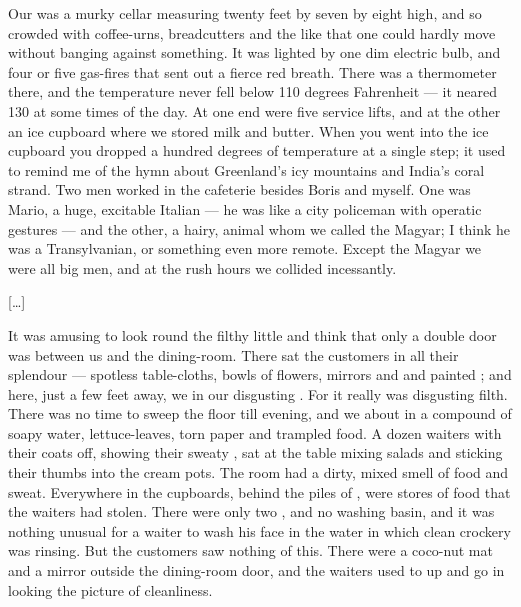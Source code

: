 \documentclass{fiche}
\begin{document}
\begin{texte}
Our  was a murky cellar
measuring twenty feet by seven by eight high, and so crowded with coffee-urns, breadcutters
and the like that one could hardly move without banging against something. It was lighted by
one dim electric bulb, and four or five gas-fires that sent out a fierce red breath. There
was a thermometer there, and the temperature never fell below 110 degrees Fahrenheit --- it
neared 130 at some times of the day. At one end were five service lifts, and at the other an
ice cupboard where we stored milk and butter. When you went into the ice cupboard you dropped
a hundred degrees of temperature at a single step; it used to remind me of the hymn about
Greenland's icy mountains and India's coral strand. Two men worked in the cafeterie besides
Boris and myself. One was Mario, a huge, excitable Italian --- he was like a city policeman
with operatic gestures --- and the other, a hairy,  animal whom we called the Magyar; I think he was a Transylvanian, or something
even more remote. Except the Magyar we were all big men, and at the rush hours we collided
incessantly.

[\ldots]

It was amusing to look round the filthy little  and think that only a double door was between us and the dining-room.
There sat the customers in all their splendour --- spotless table-cloths, bowls of flowers,
mirrors and  and painted
 ; and here, just a few feet away, we in our disgusting
. For it really was disgusting filth. There was no time to sweep
the floor till evening, and we  about in a
compound of soapy water, lettuce-leaves, torn paper and trampled food. A dozen waiters with
their coats off, showing their sweaty , sat at the table
mixing salads and sticking their thumbs into the cream pots. The room had a dirty, mixed
smell of food and sweat. Everywhere in the cupboards, behind the piles of
, were  stores of food
that the waiters had stolen. There were only two , and no washing
basin, and it was nothing unusual for a waiter to wash his face in the water in which clean
crockery was rinsing. But the customers saw nothing of this. There were a coco-nut mat and a
mirror outside the dining-room door, and the waiters used to  up and go in looking the picture of
cleanliness.


\end{texte}
\end{document}
